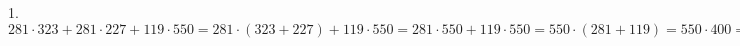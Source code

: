 1.$281\cdot323+281\cdot227+119\cdot550=281\cdot(323+227)+119\cdot550=281\cdot550+119\cdot550=550\cdot(281+119)=550\cdot400=220000.$\\

